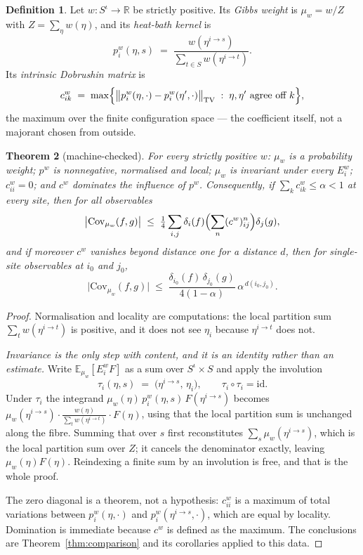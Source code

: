 \documentclass[11pt]{article}
\newtheorem{theorem}{Theorem}[section]
\theoremstyle{definition}
\newtheorem{definition}[theorem]{Definition}
\newcommand{\R}{\mathbb{R}}
\begin{document}
\begin{definition}
\label{def:heatbath}
Let $w:S^{\iota}\to\R$ be strictly positive.  Its \emph{Gibbs weight} is
$\mu_w=w/Z$ with $Z=\sum_\eta w(\eta)$, and its \emph{heat-bath kernel} is
\[
  p^w_i(\eta,s)\;=\;\frac{w(\eta^{i\to s})}{\sum_{t\in S}w(\eta^{i\to t})} .
\]
Its \emph{intrinsic Dobrushin matrix} is
\[
  c^w_{ik}\;=\;\max\Bigl\{\bigl\|p^w_i(\eta,\cdot)-p^w_i(\eta',\cdot)
    \bigr\|_{\mathrm{TV}}\;:\;\eta,\eta'\text{ agree off }k\Bigr\},
\]
the maximum over the finite configuration space --- the coefficient itself, not
a majorant chosen from outside.
\end{definition}

\begin{theorem}[machine-checked]
\label{thm:gibbs}
For every strictly positive $w$: $\mu_w$ is a probability weight; $p^w$ is
nonnegative, normalised and local; $\mu_w$ is \emph{invariant} under every
$E^w_i$; $c^w_{ii}=0$; and $c^w$ dominates the influence of $p^w$.
Consequently, if $\sum_k c^w_{ik}\le\alpha<1$ at every site, then for all
observables
\[
  \bigl|\mathrm{Cov}_{\mu_w}(f,g)\bigr|\;\le\;
  \tfrac14\sum_{i,j}\delta_i(f)\Bigl(\sum_n (c^w)^n_{ij}\Bigr)\delta_j(g),
\]
and if moreover $c^w$ vanishes beyond distance one for a distance $d$, then for
single-site observables at $i_0$ and $j_0$,
\[
  \bigl|\mathrm{Cov}_{\mu_w}(f,g)\bigr|\;\le\;
  \frac{\delta_{i_0}(f)\,\delta_{j_0}(g)}{4(1-\alpha)}\,\alpha^{\,d(i_0,j_0)} .
\]
\end{theorem}

\begin{proof}
Normalisation and locality are computations: the local partition sum
$\sum_t w(\eta^{i\to t})$ is positive, and it does not see $\eta_i$ because
$\eta^{i\to t}$ does not.

\emph{Invariance is the only step with content, and it is an identity rather
than an estimate.}  Write $\mathbb{E}_{\mu_w}[E^w_iF]$ as a sum over
$S^{\iota}\times S$ and apply the involution
\[
  \tau_i(\eta,s)\;=\;\bigl(\eta^{i\to s},\,\eta_i\bigr),
  \qquad \tau_i\circ\tau_i=\mathrm{id}.
\]
Under $\tau_i$ the integrand
$\mu_w(\eta)\,p^w_i(\eta,s)\,F(\eta^{i\to s})$ becomes
$\mu_w(\eta^{i\to s})\cdot\frac{w(\eta)}{\sum_t w(\eta^{i\to t})}\cdot F(\eta)$,
using that the local partition sum is unchanged along the fibre.  Summing that
over $s$ first reconstitutes $\sum_s\mu_w(\eta^{i\to s})$, which is the local
partition sum over $Z$; it cancels the denominator exactly, leaving
$\mu_w(\eta)F(\eta)$.  Reindexing a finite sum by an involution is free, and
that is the whole proof.

The zero diagonal is a theorem, not a hypothesis: $c^w_{ii}$ is a maximum of
total variations between $p^w_i(\eta,\cdot)$ and $p^w_i(\eta^{i\to s},\cdot)$,
which are equal by locality.  Domination is immediate because $c^w$ is defined
as the maximum.  The conclusions are Theorem~\ref{thm:comparison} and its
corollaries applied to this data.
\end{proof}
\end{document}
